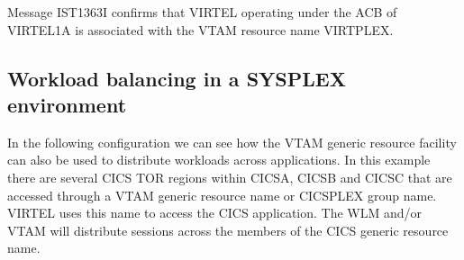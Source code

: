 \documentclass[letterpaper,10pt,english]{sphinxmanual}
\begin{document}
\begin{sphinxVerbatim}[commandchars=\\\{\}]
         
      
          
   
         
        
 
        
      
 
\end{sphinxVerbatim}

\sphinxAtStartPar
Message IST1363I confirms that VIRTEL operating under the ACB of VIRTEL1A is associated with the VTAM resource name VIRTPLEX.

\newpage

\ignorespaces 

\subsection{Workload balancing in a SYSPLEX environment}
\label{\detokenize{connectivity_guide:workload-balancing-in-a-sysplex-environment}}\label{\detokenize{connectivity_guide:index-172}}
\sphinxAtStartPar
In the following configuration we can see how the VTAM generic resource facility can also be used to distribute workloads across applications. In this example there are several CICS TOR regions within CICSA, CICSB and CICSC that are accessed through a VTAM generic resource name or CICSPLEX group name. VIRTEL uses this name to access the CICS application. The WLM and/or VTAM will distribute sessions across the members of the CICS generic resource name.
\end{document}

